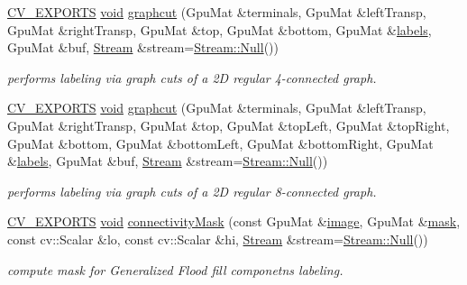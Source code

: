 \begin{DoxyCompactItemize}
\item 
\hyperlink{core_2types__c_8h_a1bf9f0e121b54272da02379cfccd0a2b}{C\-V\-\_\-\-E\-X\-P\-O\-R\-T\-S} \hyperlink{legacy_8hpp_a8bb47f092d473522721002c86c13b94e}{void} \hyperlink{namespacecv_1_1gpu_aa9eb3f896ec9b04e57db7fba316650ef}{graphcut} (Gpu\-Mat \&terminals, Gpu\-Mat \&left\-Transp, Gpu\-Mat \&right\-Transp, Gpu\-Mat \&top, Gpu\-Mat \&bottom, Gpu\-Mat \&\hyperlink{core__c_8h_a1342f74a0f7dd7c20ab7e79b2e6e5af5}{labels}, Gpu\-Mat \&buf, \hyperlink{classcv_1_1gpu_1_1Stream}{Stream} \&stream=\hyperlink{classcv_1_1gpu_1_1Stream_af96c23564834f88333dcb8997df553f1}{Stream\-::\-Null}())
\begin{DoxyCompactList}\small\item\em performs labeling via graph cuts of a 2\-D regular 4-\/connected graph. \end{DoxyCompactList}\item 
\hyperlink{core_2types__c_8h_a1bf9f0e121b54272da02379cfccd0a2b}{C\-V\-\_\-\-E\-X\-P\-O\-R\-T\-S} \hyperlink{legacy_8hpp_a8bb47f092d473522721002c86c13b94e}{void} \hyperlink{namespacecv_1_1gpu_a3edc0f0c628ce2df2ba7a2c6b7992e47}{graphcut} (Gpu\-Mat \&terminals, Gpu\-Mat \&left\-Transp, Gpu\-Mat \&right\-Transp, Gpu\-Mat \&top, Gpu\-Mat \&top\-Left, Gpu\-Mat \&top\-Right, Gpu\-Mat \&bottom, Gpu\-Mat \&bottom\-Left, Gpu\-Mat \&bottom\-Right, Gpu\-Mat \&\hyperlink{core__c_8h_a1342f74a0f7dd7c20ab7e79b2e6e5af5}{labels}, Gpu\-Mat \&buf, \hyperlink{classcv_1_1gpu_1_1Stream}{Stream} \&stream=\hyperlink{classcv_1_1gpu_1_1Stream_af96c23564834f88333dcb8997df553f1}{Stream\-::\-Null}())
\begin{DoxyCompactList}\small\item\em performs labeling via graph cuts of a 2\-D regular 8-\/connected graph. \end{DoxyCompactList}\item 
\hyperlink{core_2types__c_8h_a1bf9f0e121b54272da02379cfccd0a2b}{C\-V\-\_\-\-E\-X\-P\-O\-R\-T\-S} \hyperlink{legacy_8hpp_a8bb47f092d473522721002c86c13b94e}{void} \hyperlink{namespacecv_1_1gpu_a0d4ec2248d226a50b61a14eb4def99f2}{connectivity\-Mask} (const Gpu\-Mat \&\hyperlink{legacy_8hpp_ad62b16ab219ae2483e8a3d921c44cc97}{image}, Gpu\-Mat \&\hyperlink{tracking_8hpp_a6b13ecd2fd6ec7ad422f1d7863c3ad19}{mask}, const cv\-::\-Scalar \&lo, const cv\-::\-Scalar \&hi, \hyperlink{classcv_1_1gpu_1_1Stream}{Stream} \&stream=\hyperlink{classcv_1_1gpu_1_1Stream_af96c23564834f88333dcb8997df553f1}{Stream\-::\-Null}())
\begin{DoxyCompactList}\small\item\em compute mask for Generalized Flood fill componetns labeling. \end{DoxyCompactList}\item 

\end{DoxyCompactItemize}
